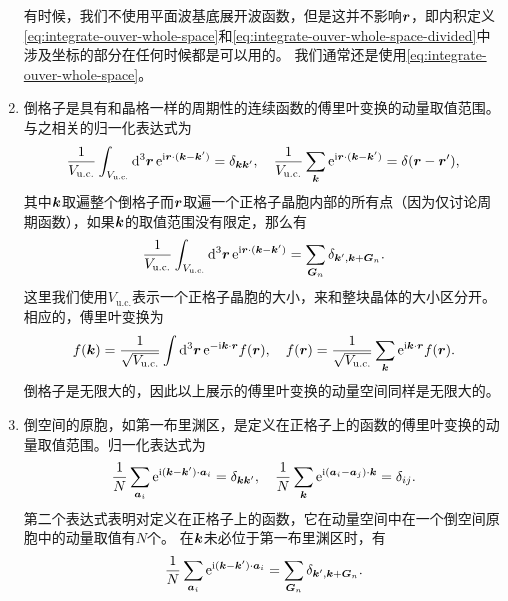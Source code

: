 \begin{enumerate}
    有时候，我们不使用平面波基底展开波函数，但是这并不影响$\vb*{r}$，即内积定义\eqref{eq:integrate-ouver-whole-space}和\eqref{eq:integrate-ouver-whole-space-divided}中涉及坐标的部分在任何时候都是可以用的。
    我们通常还是使用\eqref{eq:integrate-ouver-whole-space}。

    \item 倒格子是具有和晶格一样的周期性的连续函数的傅里叶变换的动量取值范围。与之相关的归一化表达式为
    \begin{equation}
        \frac{1}{V_\text{u.c.}} \int_{V_\text{u.c.}} \dd[3]{\vb*{r}} \mathrm{e}^{\mathrm{i} \vb*{r} \cdot (\vb*{k} - \vb*{k}')} = \delta_{\vb*{k} \vb*{k}'}, \quad \frac{1}{V_\text{u.c.}} \sum_{\vb*{k}} \mathrm{e}^{\mathrm{i} \vb*{r} \cdot (\vb*{k} - \vb*{k}')} = \delta(\vb*{r} - \vb*{r}'), 
        \label{eq:normalization-periodic}
    \end{equation}
    其中$\vb*{k}$取遍整个倒格子而$\vb*{r}$取遍一个正格子晶胞内部的所有点（因为仅讨论周期函数），如果$\vb*{k}$的取值范围没有限定，那么有
    \begin{equation}
        \frac{1}{V_\text{u.c.}} \int_{V_\text{u.c.}} \dd[3]{\vb*{r}} \mathrm{e}^{\mathrm{i} \vb*{r} \cdot (\vb*{k} - \vb*{k}')} = \sum_{\vb*{G}_n} \delta_{\vb*{k}', \vb*{k} + \vb*{G}_n}.
    \end{equation}
    这里我们使用$V_\text{u.c.}$表示一个正格子晶胞的大小，来和整块晶体的大小区分开。相应的，傅里叶变换为
    \begin{equation}
        f(\vb*{k}) = \frac{1}{\sqrt{V_\text{u.c.}}} \int \dd[3]{\vb*{r}} \mathrm{e}^{- \mathrm{i} \vb*{k} \cdot \vb*{r}} f(\vb*{r}), \quad f(\vb*{r}) = \frac{1}{\sqrt{V_\text{u.c.}}} \sum_{\vb*{k}} \mathrm{e}^{\mathrm{i} \vb*{k} \cdot \vb*{r}} f(\vb*{r}).
    \end{equation}
    倒格子是无限大的，因此以上展示的傅里叶变换的动量空间同样是无限大的。
    \item 倒空间的原胞，如第一布里渊区，是定义在正格子上的函数的傅里叶变换的动量取值范围。归一化表达式为
    \begin{equation}
        \frac{1}{N} \sum_{\vb*{a}_i} \mathrm{e}^{\mathrm{i} (\vb*{k} - \vb*{k}') \cdot \vb*{a}_i} = \delta_{\vb*{k} \vb*{k}'}, \quad \frac{1}{N} \sum_{\vb*{k}} \mathrm{e}^{\mathrm{i} (\vb*{a}_i - \vb*{a}_j) \cdot \vb*{k}} = \delta_{ij}.
    \end{equation}
    第二个表达式表明对定义在正格子上的函数，它在动量空间中在一个倒空间原胞中的动量取值有$N$个。
    在$\vb*{k}$未必位于第一布里渊区时，有
    \begin{equation}
        \frac{1}{N} \sum_{\vb*{a}_i} \ee^{\ii (\vb*{k} - \vb*{k}') \cdot \vb*{a}_i} = \sum_{\vb*{G}_n} \delta_{\vb*{k}', \vb*{k}+\vb*{G}_n}.

\end{equation}
\end{enumerate}

